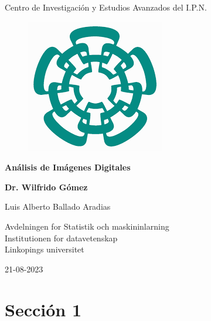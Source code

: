 \documentclass[a4paper, 11pt]{article}
\begin{document}

\begin{titlepage}
  \clearpage\thispagestyle{empty}
  \centering
  \vspace{1cm}
  {\large Centro de Investigación y Estudios Avanzados del I.P.N. \par}
  \vspace{1cm}

  \begin{figure}[h!]
    \centering
    \includegraphics[scale=0.5]{cinves.png}
  \end{figure}
    
  \vspace{1cm}
  {\Huge \textbf{Análisis de Imágenes Digitales}} \\
  \vspace{1cm}
  {\large \textbf{Dr. Wilfrido Gómez} \par}
  \vspace{4cm}
         {\normalsize Luis Alberto Ballado Aradias \par} 
  \vspace{2cm}
    
  {\normalsize Avdelningen for Statistik och maskininlarning \\
    Institutionen for datavetenskap \\
    Linkopings universitet \par}
  
  {\normalsize 21-08-2023 \par}
  \vspace{2cm}
    
  \pagebreak
  
\end{titlepage}

\tableofcontents{}

\pagebreak
\section{Sección 1}
\end{document}
